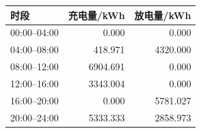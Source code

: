 \begin{tabular}{lrr}
\toprule
时段 & 充电量/kWh & 放电量/kWh \\
\midrule
00:00--04:00 & 0.000 & 0.000 \\
04:00--08:00 & 418.971 & 4320.000 \\
08:00--12:00 & 6904.691 & 0.000 \\
12:00--16:00 & 3343.004 & 0.000 \\
16:00--20:00 & 0.000 & 5781.027 \\
20:00--24:00 & 5333.333 & 2858.973 \\
\bottomrule
\end{tabular}
